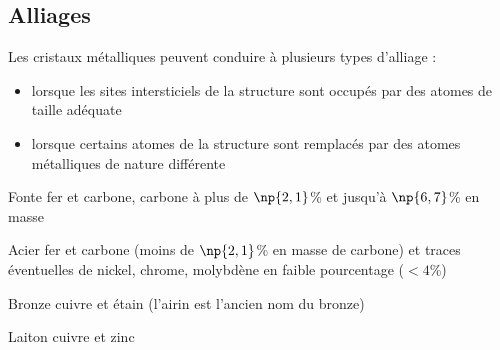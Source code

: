 \subsection*{Alliages}
Les cristaux métalliques peuvent conduire à plusieurs types
d'alliage :
\begin{itemize}
    \item lorsque les sites intersticiels de la structure sont
        occupés par des atomes de taille adéquate
    \item lorsque certains atomes de la structure sont remplacés
        par des atomes métalliques de nature différente
\end{itemize}
\begin{ex}
    \begin{compactdesc}
        \item[Fonte] fer et carbone, carbone à plus de $\np{2,1}$\%
            et jusqu'à $\np{6,7}$\% en masse
        \item[Acier] fer et carbone (moins de $\np{2,1}$\% en masse
            de carbone) et traces éventuelles de nickel, chrome,
            molybdène en faible pourcentage ($<4$\%)
    \end{compactdesc}
\end{ex}
\begin{ex}
    \begin{compactdesc}
        \item[Bronze] cuivre et étain (l'airin est l'ancien nom
            du bronze)
        \item[Laiton] cuivre et zinc
    \end{compactdesc}
\end{ex}
